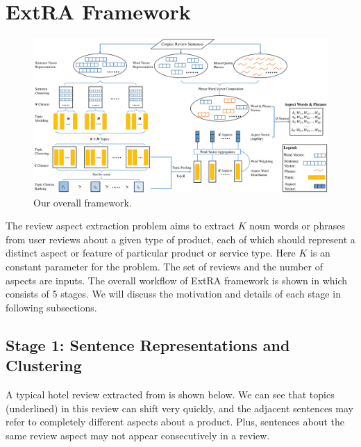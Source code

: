 \section{ExtRA Framework}
\label{sec:method}

\begin{figure}[th]
	\centering
	\includegraphics[width=\textwidth]{figures/overview}
	\caption{Our overall framework.}
	\label{fig:framework}
\end{figure}

The review aspect extraction problem aims to extract $K$ noun words or phrases 
from user reviews about a given type of product,
each of which should represent a distinct aspect or feature of particular product or service type. 
Here $K$ is an constant parameter for the problem. 
The set of reviews and the number of aspects are inputs.
The overall workflow of ExtRA framework is shown in  which consists of 5 stages. 
We will discuss the motivation and details of each stage in following subsections.

\subsection{Stage 1: Sentence Representations and Clustering}

A typical hotel review extracted from  
is shown below. We can see that topics (underlined) in this review 
can shift very quickly, and
the adjacent sentences may refer to 
completely different aspects about a product. 
Plus, sentences about the same review aspect may not 
appear consecutively in a review. 

